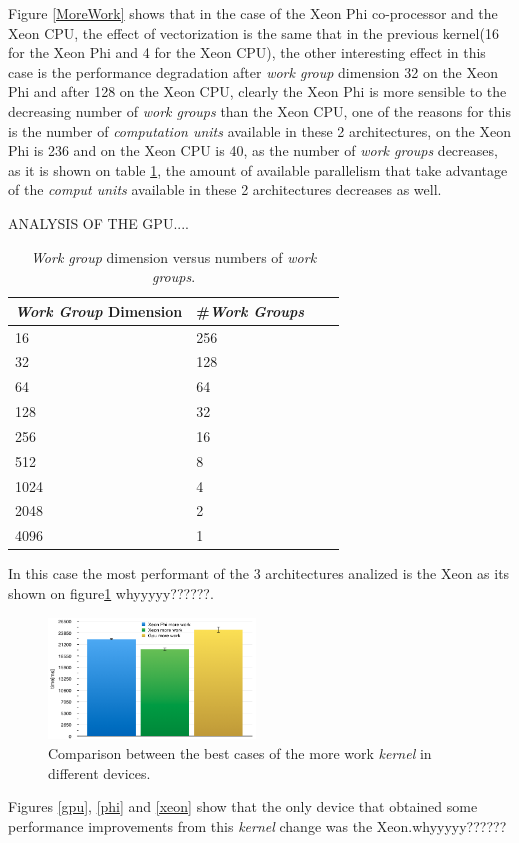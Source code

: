 \par{Figure \ref{MoreWork} shows that in the case of the Xeon Phi co-processor 
    and the Xeon CPU, the effect of vectorization
    is the same that in the previous kernel(16 for the Xeon Phi and 4 for the 
    Xeon CPU), the other interesting effect in this
    case is the performance degradation after \emph{work group} dimension 32 
    on the Xeon Phi and after 128 on the Xeon
    CPU, clearly the Xeon Phi is more sensible to the decreasing number of 
    \emph{work groups} than the Xeon CPU, one of the 
    reasons for this is the number of \emph{computation units} available in 
    these 2 architectures, on the Xeon Phi is 236 and
    on the Xeon CPU is 40, as the number of \emph{work groups} decreases, 
    as it is shown on table \ref{tab:work_groups}, the amount
    of available parallelism that take advantage of the \emph{comput units} 
    available in these 2 architectures decreases as well.}

\par{{\color{red} ANALYSIS OF THE GPU....}}

\begin{table}[!h]
    \centering
    \begin{tabular}{| l | l | l | l |}
    \hline
    \emph{Work Group} Dimension & \#\emph{Work Groups} \\ \hline
    16 & 256 \\ \hline
    32 & 128 \\ \hline
    64 & 64 \\ \hline
    128 & 32 \\ \hline
    256 & 16 \\ \hline
    512 & 8 \\ \hline
    1024 & 4 \\ \hline
    2048 & 2 \\ \hline
    4096 & 1 \\ 
    \hline
    \end{tabular}
    \caption{\emph{Work group} dimension versus numbers of \emph{work groups}.}
    \label{tab:work_groups}
\end{table}

\par{In this case the most performant of the 3 architectures analized is the 
    Xeon as its shown on figure\ref{MoreWorkRes} {\color{red}whyyyyy??????}.}

\begin{figure}[!h]
    \centering
    \includegraphics[width=0.49\textwidth]{figures/moreWorkRes.png}
    \caption{Comparison between the best cases of the more work \emph{kernel} in different devices.}
    \label{MoreWorkRes}
\end{figure}

\par{Figures \ref{gpu}, \ref{phi} and \ref{xeon} show that the 
    only device that obtained some performance improvements from this \emph{kernel}
    change was the Xeon.{\color{red}whyyyyy??????}}





